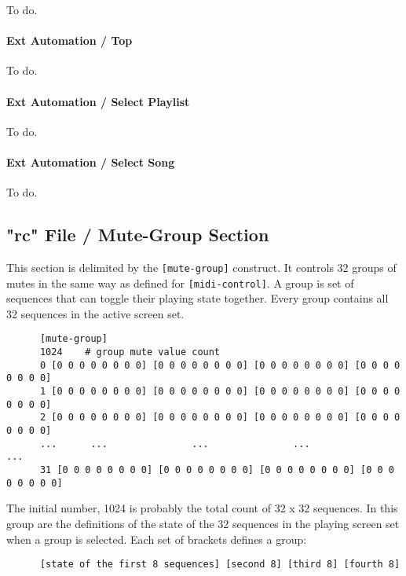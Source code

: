   To do.

\paragraph{Ext Automation / Top}
\label{paragraph:rc_file_midi_ctrl_ex_top}

   To do.

\paragraph{Ext Automation / Select Playlist}
\label{paragraph:rc_file_midi_ctrl_ex_sellist}

   To do.

\paragraph{Ext Automation / Select Song}
\label{paragraph:rc_file_midi_ctrl_ex_selsong}

   To do.

\subsection{"rc" File / Mute-Group Section}
\label{subsec:rc_file_mute_group}
     
   This section is delimited by the \texttt{[mute-group]} construct.
   It controls 32 groups of mutes in the same way as defined for
   \texttt{[midi-control]}. A group is set of sequences that can toggle their
   playing state together.  Every group contains all 32 sequences in the
   active screen set.

   \begin{verbatim}
      [mute-group]
      1024    # group mute value count
      0 [0 0 0 0 0 0 0 0] [0 0 0 0 0 0 0 0] [0 0 0 0 0 0 0 0] [0 0 0 0 0 0 0 0]
      1 [0 0 0 0 0 0 0 0] [0 0 0 0 0 0 0 0] [0 0 0 0 0 0 0 0] [0 0 0 0 0 0 0 0]
      2 [0 0 0 0 0 0 0 0] [0 0 0 0 0 0 0 0] [0 0 0 0 0 0 0 0] [0 0 0 0 0 0 0 0]
      ...      ...               ...               ...               ...
      31 [0 0 0 0 0 0 0 0] [0 0 0 0 0 0 0 0] [0 0 0 0 0 0 0 0] [0 0 0 0 0 0 0 0]
   \end{verbatim}

   The initial number, 1024 is probably the total count of 32 x 32 sequences.
   In this group are the definitions of the state of the 32 sequences
   in the playing screen set when a group is selected.
   Each set of brackets defines a group:
   
   \begin{verbatim}
      [state of the first 8 sequences] [second 8] [third 8] [fourth 8]
   \end{verbatim}

